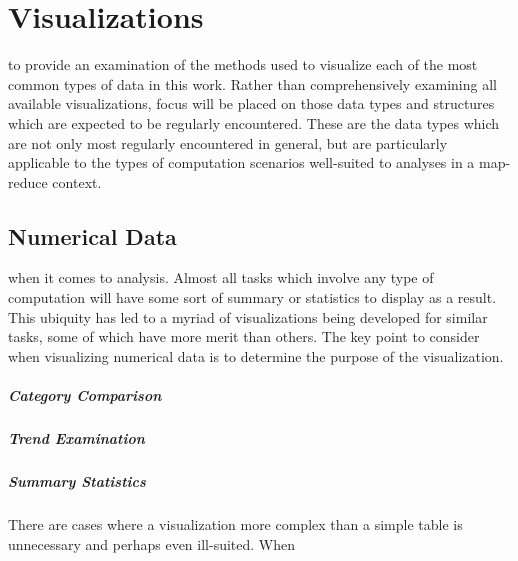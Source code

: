 \chapter{Visualizations}
\label{sec:visualizations}
 to provide an examination of the methods used to visualize each of the most common types of data in this work. Rather than comprehensively examining all available visualizations, focus will be placed on those data types and structures which are expected to be regularly encountered. These are the data types which are not only most regularly encountered in general, but are particularly applicable to the types of computation scenarios well-suited to analyses in a map-reduce context. 
 

\section{Numerical Data}
\label{sec:numerical_data}
 when it comes to analysis. Almost all tasks which involve any type of computation will have some sort of summary  or statistics to display as a result. This ubiquity has led to a myriad of visualizations being developed for similar tasks, some of which have more merit than others. The key point to consider when visualizing numerical data is to determine the purpose of the visualization. 

\paragraph{Category Comparison}

\paragraph{Trend Examination} 

\paragraph{Summary Statistics}
There are cases where a visualization more complex than a simple table is unnecessary and perhaps even ill-suited. When 



